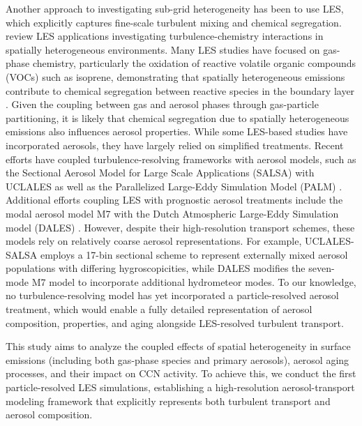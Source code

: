 \documentclass[acp, manuscript]{copernicus}
\begin{document}
Another approach to investigating sub-grid heterogeneity has been to
use LES, which explicitly captures fine-scale turbulent mixing and
chemical segregation.  \citet{brasseur_segregation_2023} review LES
applications investigating turbulence-chemistry interactions in
spatially heterogeneous environments.  Many LES studies have focused
on gas-phase chemistry, particularly the oxidation of reactive
volatile organic compounds (VOCs) such as isoprene, demonstrating that
spatially heterogeneous emissions contribute to chemical segregation
between reactive species in the boundary layer
\citep{ouwersloot_segregation_2011, kaser_chemistry-turbulence_2015}.
Given the coupling between gas and aerosol phases through gas-particle
partitioning, it is likely that chemical segregation due to spatially
heterogeneous emissions also influences aerosol properties. While some
LES-based studies have incorporated aerosols, they have largely relied
on simplified treatments. Recent efforts have coupled
turbulence-resolving frameworks with aerosol models, such as the
Sectional Aerosol Model for Large Scale Applications (SALSA)
\citep{kokkola_salsa_2008} with UCLALES
\citep{tonttila_uclalessalsa_2017} as well as the Parallelized
Large-Eddy Simulation Model (PALM)
\citep{kurppa_implementation_2019}. Additional efforts coupling LES
with prognostic aerosol treatments include the modal aerosol model M7
\citep{vignati_m7_2004} with the Dutch Atmospheric Large-Eddy
Simulation model (DALES) \citep{de_bruine_explicit_2019}. However,
despite their high-resolution transport schemes, these models rely on
relatively coarse aerosol representations. For example, UCLALES-SALSA
employs a 17-bin sectional scheme to represent externally mixed
aerosol populations with differing hygroscopicities, while DALES
modifies the seven-mode M7 model to incorporate additional hydrometeor
modes. To our knowledge, no turbulence-resolving model has yet
incorporated a particle-resolved aerosol treatment, which would enable
a fully detailed representation of aerosol composition, properties,
and aging alongside LES-resolved turbulent transport.

This study aims to analyze the coupled effects of spatial
heterogeneity in surface emissions (including both gas-phase species
and primary aerosols), aerosol aging processes, and their impact on
CCN activity. To achieve this, we conduct the first particle-resolved
LES simulations, establishing a high-resolution aerosol-transport
modeling framework that explicitly represents both turbulent transport
and aerosol composition.
\end{document}

